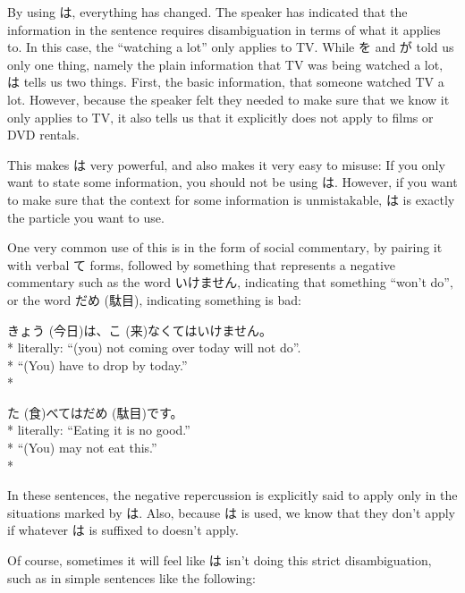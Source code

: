 \documentclass[11pt, b5paper, twoside, openright, onecolumn]{book}
\makeatletter
\newcommand*{\rubystack}[2]{{\relscale{0.5}%
  \begin{tabular}[b]{@{}c@{}}%
    {#1}\\%
   {\textscale{2}{#2}}%
  \end{tabular}}%
}
\DeclareRobustCommand*{\ruby}[2]{%
  \mbox{%
    \setlength{\parskip}{0ex}%
    \BeginAccSupp{method=pdfstringdef,ActualText={#1}}%
      \rubystack{\phantom{#2}}{#1}%
      \llap{%
        \rubystack{#2}{\phantom{#1}}%
      }%
    \EndAccSupp{}%
  }%
}
\renewcommand*{\ruby}[2]{#2 (#1)}%
\newenvironment{exampleblock}{
\setlength{\parindent}{0.6in}
\begin{minipage}[t]{\dimexpr\textwidth-\parindent}}
{\end{minipage}}
\makeatother
\begin{document}
By using は‚ everything has changed. The speaker has indicated that the information in the sentence requires disambiguation in terms of what it applies to. In this case‚ the “watching a lot” only applies to TV. While を and が told us only one thing‚ namely the plain information that TV was being watched a lot‚ は tells us two things. First‚ the basic information‚ that someone watched TV a lot. However‚ because the speaker felt they needed to make sure that we know it only applies to TV‚ it also tells us that it explicitly does not apply to films or DVD rentals.

This makes は very powerful‚ and also makes it very easy to misuse: If you only want to state some information‚ you should not be using は. However‚ if you want to make sure that the context for some information is unmistakable‚ は is exactly the particle you want to use.

One very common use of this is in the form of social commentary‚ by pairing it with verbal て forms‚ followed by something that represents a negative commentary such as the word いけません‚ indicating that something “won’t do”‚ or the word \ruby{駄目}{だめ}‚ indicating something is bad:

\vspace{0.4cm}
\begin{exampleblock}
\ruby{今日}{きょう}は、\ruby{来}{こ}なくてはいけません。 \\* 
literally: “(you) not coming over today will not do”. \\* 
“(You) have to drop by today.” \\* 
\end{exampleblock}
\vspace{0.2cm}

\begin{exampleblock}
\ruby{食}{た}べては\ruby{駄目}{だめ}です。 \\* 
literally: “Eating it is no good.” \\* 
“(You) may not eat this.” \\* 
\end{exampleblock}
\vspace{0.2cm}

In these sentences‚ the negative repercussion is explicitly said to apply only in the situations marked by は. Also‚ because は is used‚ we know that they don’t apply if whatever は is suffixed to doesn’t apply.

Of course‚ sometimes it will feel like は isn’t doing this strict disambiguation‚ such as in simple sentences like the following:
\end{document}
